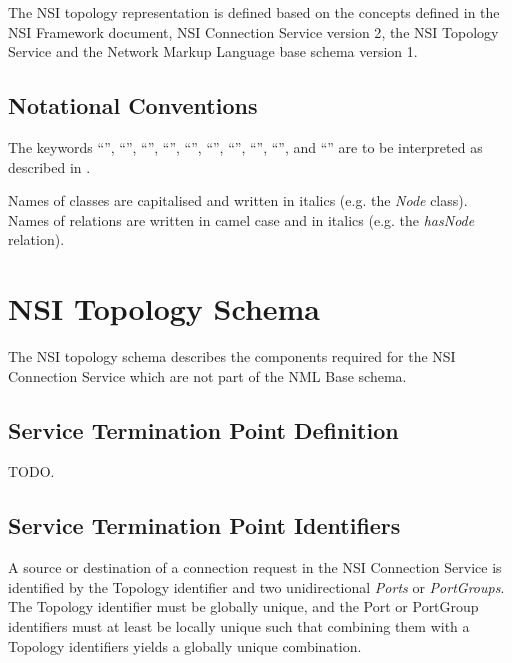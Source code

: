 \documentclass[12pt]{article}  %
\begin{document}
The NSI topology representation is defined based on the concepts defined in the NSI Framework document\cite{nsi-fw}, NSI Connection Service version 2\cite{nsiv2}, the NSI Topology Service\cite{nsi-ts} and the Network Markup Language base schema version 1\cite{nml}.

\subsection{Notational Conventions}%
\label{sec:rfc2119}

The keywords “\MUST{}”, “\MUSTNOT{}”, “\REQUIRED{}”, “\SHALL{}”, “\SHALLNOT{}”, 
“\SHOULD{}”, “\SHOULDNOT{}”, “\RECOMMENDED{}”, “\MAY{}”,  and “\OPTIONAL{}” are 
to be interpreted as described in \cite{rfc2119}.

Names of classes are capitalised and written in italics (e.g. the \emph{Node} class).
Names of relations are written in camel case and in italics (e.g. the \emph{hasNode} relation).




\section{NSI Topology Schema}\label{sec:syntax}

The NSI topology schema describes the components required for the NSI Connection Service which are not part of the NML Base schema. 

\subsection{Service Termination Point Definition} %
\label{sub:service_termination_point_definition}

TODO.

\subsection{Service Termination Point Identifiers}

A source or destination of a connection request in the NSI Connection Service is identified by 
the Topology identifier and two unidirectional \emph{Ports} or \emph{PortGroups}. The Topology identifier must be globally unique, and the Port or PortGroup identifiers must at least be locally unique such that combining them with a Topology identifiers yields a globally unique combination.
\end{document}

